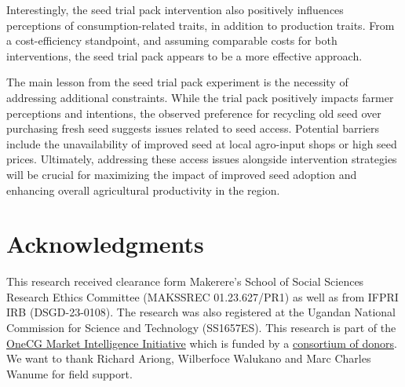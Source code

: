 \documentclass[english]{article}\usepackage[]{graphicx}\usepackage[]{xcolor}
\begin{document}
Interestingly, the seed trial pack intervention also positively influences
perceptions of consumption-related traits, in addition to production
traits. From a cost-efficiency standpoint, and assuming comparable
costs for both interventions, the seed trial pack appears to be a
more effective approach.

The main lesson from the seed trial pack experiment is the necessity
of addressing additional constraints. While the trial pack positively
impacts farmer perceptions and intentions, the observed preference
for recycling old seed over purchasing fresh seed suggests issues
related to seed access. Potential barriers include the unavailability
of improved seed at local agro-input shops or high seed prices. Ultimately,
addressing these access issues alongside intervention strategies will
be crucial for maximizing the impact of improved seed adoption and
enhancing overall agricultural productivity in the region.

\section{Acknowledgments}

This research received clearance form Makerere's School of Social
Sciences Research Ethics Committee (MAKSSREC 01.23.627/PR1) as well
as from IFPRI IRB (DSGD-23-0108). The research was also registered
at the Ugandan National Commission for Science and Technology (SS1657ES).
This research is part of the \href{https://www.cgiar.org/initiative/market-intelligence/}{OneCG Market Intelligence Initiative}
which is funded by a \href{https://www.cgiar.org/funders/}{consortium of donors}.
We want to thank Richard Ariong, Wilberfoce Walukano and Marc Charles
Wanume for field support.



\end{document}
